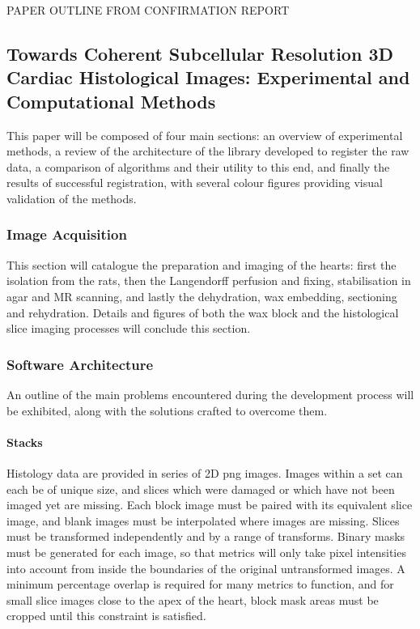 
PAPER OUTLINE FROM CONFIRMATION REPORT
\subsection{Towards Coherent Subcellular Resolution 3D Cardiac Histological Images: Experimental and Computational Methods}
  This paper will be composed of four main sections: an overview of experimental methods, a review of the architecture of the library developed to register the raw data, a comparison of algorithms and their utility to this end, and finally the results of successful registration, with several colour figures providing visual validation of the methods.

  \subsubsection{Image Acquisition}
    This section will catalogue the preparation and imaging of the hearts: first the isolation from the rats, then the Langendorff perfusion and fixing, stabilisation in agar and MR scanning, and lastly the dehydration, wax embedding, sectioning and rehydration. Details and figures of both the wax block and the histological slice imaging processes will conclude this section.

    \subsubsection{Software Architecture}
      An outline of the main problems encountered during the development process will be exhibited, along with the solutions crafted to overcome them.
      
      \paragraph{Stacks}
        Histology data are provided in series of 2D png images. Images within a set can each be of unique size, and slices which were damaged or which have not been imaged yet are missing. Each block image must be paired with its equivalent slice image, and blank images must be interpolated where images are missing. Slices must be transformed independently and by a range of transforms. Binary masks must be generated for each image, so that metrics will only take pixel intensities into account from inside the boundaries of the original untransformed images. A minimum percentage overlap is required for many metrics to function, and for small slice images close to the apex of the heart, block mask areas must be cropped until this constraint is satisfied.
        
